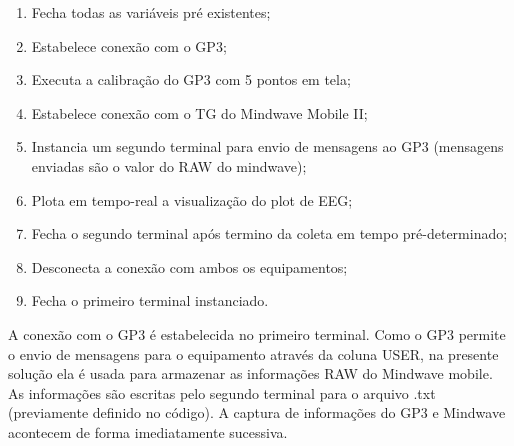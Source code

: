 \begin{enumerate}
    \item Fecha todas as variáveis pré existentes;
    \item Estabelece conexão com o GP3;
    \item Executa a calibração do GP3 com 5 pontos em tela;
    \item Estabelece conexão com o TG do Mindwave Mobile II;
    \item Instancia um segundo terminal para envio de mensagens ao GP3 (mensagens enviadas são o valor do RAW do mindwave);
    \item Plota em tempo-real a visualização do plot de EEG;
    \item Fecha o segundo terminal após termino da coleta em tempo pré-determinado;
    \item Desconecta a conexão com ambos os equipamentos;
    \item Fecha o primeiro terminal instanciado.
\end{enumerate}

 A conexão com o GP3 é estabelecida no primeiro terminal. Como o GP3 permite 
 o envio de mensagens para o equipamento através da coluna USER, na presente solução ela é
 usada para armazenar as informações RAW do Mindwave mobile. As informações são escritas 
 pelo segundo terminal para o arquivo .txt (previamente definido no código). A captura de informações 
 do GP3 e Mindwave acontecem de forma imediatamente sucessiva. 